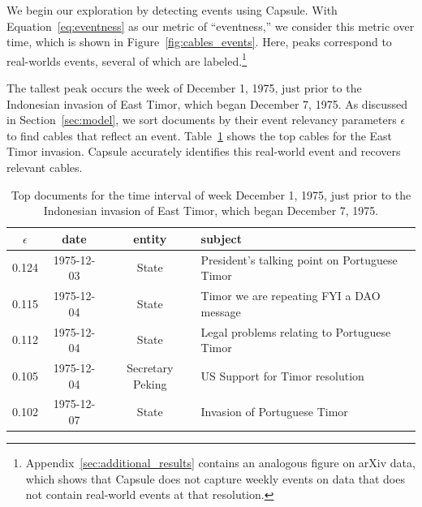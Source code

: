 We begin our exploration by detecting events using Capsule.  With Equation~\ref{eq:eventness} as our metric of ``eventness,'' we consider this metric over time, which is shown in Figure~\ref{fig:cables_events}.  Here, peaks correspond to real-worlds events, several of which are labeled.\footnote{Appendix~\ref{sec:additional_results} contains an analogous figure on arXiv data, which shows that Capsule does not capture weekly events on data that does not contain real-world events at that resolution.}

The tallest peak occurs the week of December 1, 1975, just prior to the Indonesian invasion of East Timor, which began December 7, 1975.  As discussed in Section~\ref{sec:model}, we sort documents by their event relevancy parameters $\epsilon$ to find cables that reflect an event.  Table~\ref{tab:timor} shows the top cables for the East Timor invasion.  Capsule accurately identifies this real-world event and recovers relevant cables.

\begin{table}[tb]
\small
\centering
\begin{tabular}{cccl}
\toprule
$\epsilon$ & date & entity & subject \\
\midrule
0.124   &  1975-12-03  &  State  & President's talking point on Portuguese Timor \\
0.115   &  1975-12-04  &  State  & Timor we are repeating FYI a DAO message \\
0.112   &  1975-12-04  &  State  &  Legal problems relating to Portuguese Timor\\
0.105   &  1975-12-04  &  Secretary Peking & US Support for Timor resolution \\
0.102   &  1975-12-07  &  State  & Invasion of Portuguese Timor \\
\bottomrule
\end{tabular}
\label{tab:timor}
\caption{Top documents for the time interval of week December 1, 1975, just prior to the Indonesian invasion of East Timor, which began December 7, 1975.}
\end{table}

